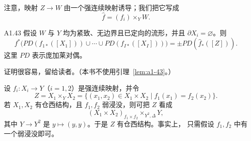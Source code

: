 注意，映射 $Z\to W$ 由一个强连续映射诱导；我们把它写成
\[
 \widehat f=(f_i)\times_YW.
\]

\begin{lemma}{A1.43}\label{lem:a1-43}
假设 $W$ 与 $Y$ 均为紧致、无边界且已定向的流形，并且
$\partial X_i=\varnothing$。则
\[
 f^*\bigl(
 PD(f_{1*}([X_1]))\cup\cdots\cup PD(f_{I*}([X_I]))
 \bigr)
 =\mathbin{\pm}PD(\widehat f_*([Z])).
\]
这里 $PD$ 表示庞加莱对偶。
\end{lemma}

证明很容易，留给读者。（本书不使用引理~\ref{lem:a1-43}。）

设 $f_i\colon X_i\to Y$（$i=1,2$）是强连续映射，并令
\[
 Z=X_1\times_YX_2
 =\{(x_1,x_2)\in X_1\times X_2\mid f_1(x_1)=f_2(x_2)\}.
\]
若 $X_1,X_2$ 有仓西结构，且 $f_1,f_2$ 弱浸没，则可把 $Z$ 看成
\[
 (X_1\times X_2)_{f_1\times f_2}\!\times_{Y^2,\Delta}Y,
\]
其中 $Y\to Y^2$ 是 $y\mapsto(y,y)$。于是 $Z$ 有仓西结构。事实上，
只需假设 $f_1,f_2$ 中有一个弱浸没即可。

